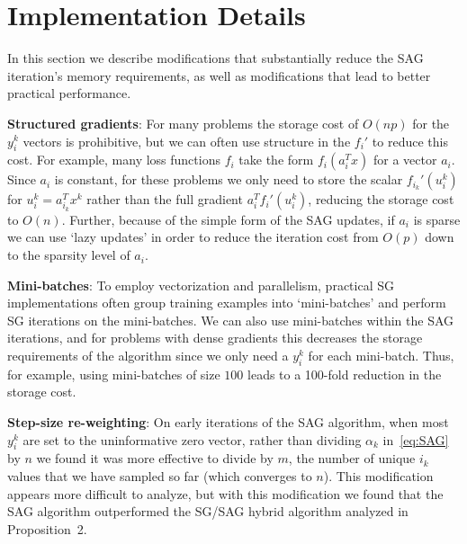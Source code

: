 \documentclass{article}
\newcommand{\mysec}[1]{Section~\ref{sec:#1}}
\begin{document}
 
 

\section{Implementation Details}
\label{implementation}
\label{sec:implementation}


In this section we describe modifications that substantially reduce the SAG iteration's memory requirements, as well as modifications that lead to better practical performance.

\textbf{Structured gradients}: For many problems the storage cost of $O(np)$ for the $y_i^k$ vectors is prohibitive, but we can often use structure in the $f_i'$ to reduce this cost. For example, many loss functions $f_i$ take the form $f_i(a_i^Tx)$ for a vector $a_i$. Since $a_i$ is constant, for these problems we only need to store the scalar $f_{i_k}'(u_i^k)$ for $u_i^k = a_{i_k}^Tx^k$ rather than the full gradient $a_i^Tf_i'(u_i^k)$, reducing the storage cost to $O(n)$.  Further, because of the simple form of the SAG updates, if $a_i$ is sparse we can use `lazy updates' in order to reduce the iteration cost from $O(p)$ down to the sparsity level of $a_i$.

\textbf{Mini-batches}: To employ vectorization and parallelism, practical SG implementations often group training examples into `mini-batches' and perform SG iterations on the mini-batches.  We can also use mini-batches within the SAG iterations, 
and for problems with dense gradients this decreases the storage requirements of the algorithm since we only need a $y_i^k$ for each mini-batch.  Thus, for example, using mini-batches of size $100$ leads to a 100-fold reduction in the storage cost.

\textbf{Step-size re-weighting}: On early iterations of the SAG algorithm, when most $y_i^k$ are set to the uninformative zero vector, rather than dividing $\alpha_k$ in~\eqref{eq:SAG} by $n$ we found it was more effective to divide by $m$, the number of unique $i_k$ values that we have sampled so far (which converges to $n$).  This modification appears more difficult to analyze, but with this modification we found that the SAG algorithm outperformed the SG/SAG hybrid algorithm analyzed in Proposition~2.
\end{document}
